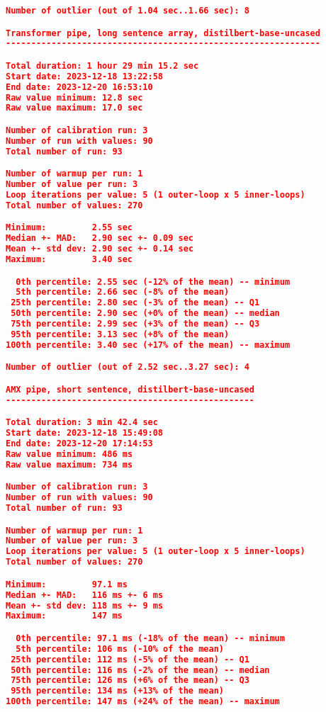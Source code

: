 \begin{lstlisting}[language=json]
Number of outlier (out of 1.04 sec..1.66 sec): 8

Transformer pipe, long sentence array, distilbert-base-uncased
--------------------------------------------------------------

Total duration: 1 hour 29 min 15.2 sec
Start date: 2023-12-18 13:22:58
End date: 2023-12-20 16:53:10
Raw value minimum: 12.8 sec
Raw value maximum: 17.0 sec

Number of calibration run: 3
Number of run with values: 90
Total number of run: 93

Number of warmup per run: 1
Number of value per run: 3
Loop iterations per value: 5 (1 outer-loop x 5 inner-loops)
Total number of values: 270

Minimum:         2.55 sec
Median +- MAD:   2.90 sec +- 0.09 sec
Mean +- std dev: 2.90 sec +- 0.14 sec
Maximum:         3.40 sec

  0th percentile: 2.55 sec (-12% of the mean) -- minimum
  5th percentile: 2.66 sec (-8% of the mean)
 25th percentile: 2.80 sec (-3% of the mean) -- Q1
 50th percentile: 2.90 sec (+0% of the mean) -- median
 75th percentile: 2.99 sec (+3% of the mean) -- Q3
 95th percentile: 3.13 sec (+8% of the mean)
100th percentile: 3.40 sec (+17% of the mean) -- maximum

Number of outlier (out of 2.52 sec..3.27 sec): 4

AMX pipe, short sentence, distilbert-base-uncased
-------------------------------------------------

Total duration: 3 min 42.4 sec
Start date: 2023-12-18 15:49:08
End date: 2023-12-20 17:14:53
Raw value minimum: 486 ms
Raw value maximum: 734 ms

Number of calibration run: 3
Number of run with values: 90
Total number of run: 93

Number of warmup per run: 1
Number of value per run: 3
Loop iterations per value: 5 (1 outer-loop x 5 inner-loops)
Total number of values: 270

Minimum:         97.1 ms
Median +- MAD:   116 ms +- 6 ms
Mean +- std dev: 118 ms +- 9 ms
Maximum:         147 ms

  0th percentile: 97.1 ms (-18% of the mean) -- minimum
  5th percentile: 106 ms (-10% of the mean)
 25th percentile: 112 ms (-5% of the mean) -- Q1
 50th percentile: 116 ms (-2% of the mean) -- median
 75th percentile: 126 ms (+6% of the mean) -- Q3
 95th percentile: 134 ms (+13% of the mean)
100th percentile: 147 ms (+24% of the mean) -- maximum


\end{lstlisting}
